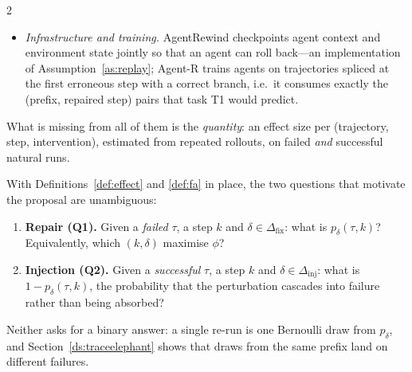 \begin{multicols}{2}
\begin{itemize}[leftmargin=1.1em]
\item \emph{Infrastructure and training.} AgentRewind \cite{zhuang2026agentrewind} checkpoints agent context and environment state jointly so that an agent can roll back---an implementation of Assumption~\ref{as:replay}; Agent-R \cite{yuan2025agentr} trains agents on trajectories spliced at the first erroneous step with a correct branch, i.e.\ it consumes exactly the (prefix, repaired step) pairs that task T1 would predict.
\end{itemize}
What is missing from all of them is the \emph{quantity}: an effect size per (trajectory, step, intervention), estimated from repeated rollouts, on failed \emph{and} successful natural runs.

With Definitions~\ref{def:effect} and \ref{def:fa} in place, the two questions that motivate the proposal are unambiguous:
\begin{enumerate}[leftmargin=1.4em]
\item \textbf{Repair (Q1).} Given a \emph{failed} $\tau$, a step $k$ and $\delta\in\Delta_{\mathrm{fix}}$: what is $p_\delta(\tau,k)$? Equivalently, which $(k,\delta)$ maximise $\phi$?
\item \textbf{Injection (Q2).} Given a \emph{successful} $\tau$, a step $k$ and $\delta\in\Delta_{\mathrm{inj}}$: what is $1-p_\delta(\tau,k)$, the probability that the perturbation cascades into failure rather than being absorbed?
\end{enumerate}
Neither asks for a binary answer: a single re-run is one Bernoulli draw from $p_\delta$, and Section~\ref{ds:traceelephant} shows that draws from the same prefix land on different failures.
\end{multicols}

